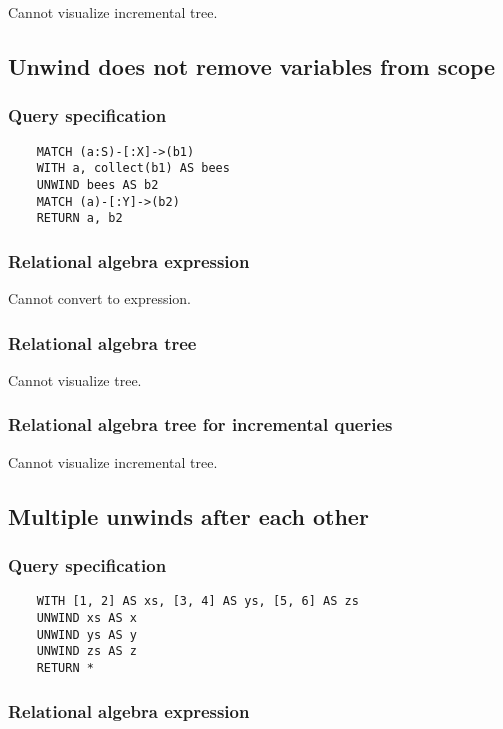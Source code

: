 	Cannot visualize incremental tree.
	\subsection{Unwind does not remove variables from scope}

	\subsubsection*{Query specification}

	\begin{lstlisting}
	MATCH (a:S)-[:X]->(b1)
	WITH a, collect(b1) AS bees
	UNWIND bees AS b2
	MATCH (a)-[:Y]->(b2)
	RETURN a, b2
	\end{lstlisting}


	\subsubsection*{Relational algebra expression}

	Cannot convert to expression.

	\subsubsection*{Relational algebra tree}

	Cannot visualize tree.

	\subsubsection*{Relational algebra tree for incremental queries}

	Cannot visualize incremental tree.
	\subsection{Multiple unwinds after each other}

	\subsubsection*{Query specification}

	\begin{lstlisting}
	WITH [1, 2] AS xs, [3, 4] AS ys, [5, 6] AS zs
	UNWIND xs AS x
	UNWIND ys AS y
	UNWIND zs AS z
	RETURN *
	\end{lstlisting}


	\subsubsection*{Relational algebra expression}

